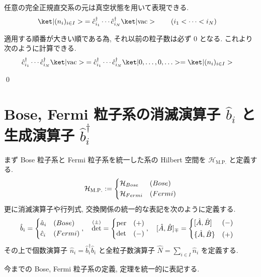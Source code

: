 \documentclass[uplatex,dvipdfmx,a4paper,11pt]{jlreq}
\makeatletter
\DeclareMathOperator{\per}{per}
\DeclareMathOperator{\Det}{det}
\newcommand{\HH}{\mathcal{H}}
\numberwithin{equation}{section}
\theoremstyle{definition}
\renewenvironment{proof}[1][\proofname]{\par
  \normalfont
  \topsep6\p@\@plus6\p@ \trivlist
  \item[\hskip\labelsep{\bfseries #1}\@addpunct{\bfseries}]\ignorespaces\quad\par
}{
  \qed\endtrivlist\@endpefalse
}
\renewcommand\proofname{証明}
\makeatother
\begin{document}
\begin{theorem}[Q21-55(ii)]
  任意の完全正規直交系の元は真空状態を用いて表現できる.
  \begin{align}
    \ket|(n_i)_{i\in I}> & = \hat{c}_{i_1}^\dagger\cdots\hat{c}_{i_N}^\dagger\ket|\mathrm{vac}> \qquad (i_1 < \cdots < i_N)
  \end{align}
\end{theorem}
\begin{proof}
  適用する順番が大きい順である為, それ以前の粒子数は必ず $0$ となる. これより次のように計算できる.
  \begin{align}
    \hat{c}_{i_1}^\dagger\cdots\hat{c}_{i_N}^\dagger\ket|\mathrm{vac}> & = \hat{c}_{i_1}^\dagger\cdots\hat{c}_{i_N}^\dagger\ket|0,\ldots,0,\ldots> = \ket|(n_i)_{i\in I}>
  \end{align}
\end{proof}

\section{Bose, Fermi 粒子系の消滅演算子 $\hat{b}_i$ と生成演算子 $\hat{b}_i^\dagger$}
\begin{definition}
  まず Bose 粒子系と Fermi 粒子系を統一した系の Hilbert 空間を $\HH_{\mathrm{M.P.}}$ と定義する.
  \begin{align}
    \HH_{\mathrm{M.P.}} := \begin{dcases}
                             \HH_{Bose}  & (Bose)  \\
                             \HH_{Fermi} & (Fermi)
                           \end{dcases}
  \end{align}
  更に消滅演算子や行列式, 交換関係の統一的な表記を次のように定義する.
  \begin{align}
    \hat{b}_i & = \begin{dcases}
                    \hat{a}_i & (Bose)  \\
                    \hat{c}_i & (Fermi)
                  \end{dcases},\quad
    \Det^{(\pm)} = \begin{dcases}
                     \per & (+) \\
                     \Det & (-)
                   \end{dcases},\quad
    [\hat{A}, \hat{B}]_\mp = \begin{dcases}
                               [\hat{A}, \hat{B}]   & (-) \\
                               \{\hat{A}, \hat{B}\} & (+)
                             \end{dcases}
  \end{align}
  その上で個数演算子 $\hat{n}_i = \hat{b}_i^\dagger\hat{b}_i$ と全粒子数演算子 $\hat{N} = \sum_{i\in I}\hat{n}_i$ を定義する.
\end{definition}
今までの Bose, Fermi 粒子系の定義, 定理を統一的に表記する.
\end{document}

